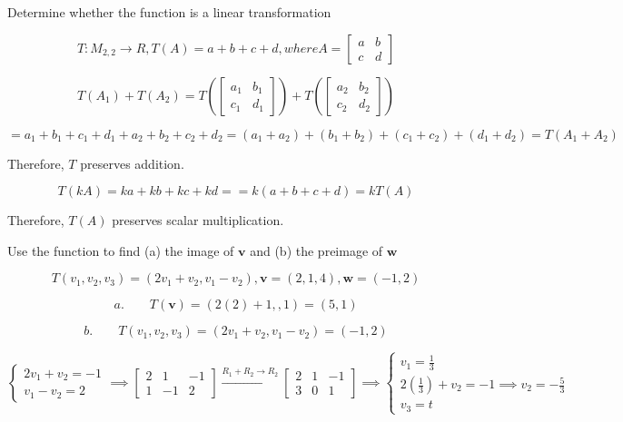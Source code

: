 \documentclass{report}
\begin{document}
\begin{tcolorbox}[colframe = lightred]
	Determine whether the function is a linear transformation
	
	$$
	T: M_{2,2} \to R, T(A) = a + b + c + d, where A = \begin{bmatrix} a & b \\ c & d \end{bmatrix}
	$$
\end{tcolorbox}

$$
T(A_1) + T(A_2) = T \left( \begin{bmatrix} a_1 & b_1 \\ c_1 & d_1 \end{bmatrix} \right) + T \left( \begin{bmatrix} a_2 & b_2 \\ c_2 & d_2 \end{bmatrix} \right)
$$

$$
= a_1 + b_1 + c_1 + d_1 + a_2 + b_2 + c_2 + d_2 = (a_1 + a_2) + (b_1 + b_2) + (c_1 + c_2) + (d_1 + d_2)  =T (A_1 + A_2)
$$

\noindent Therefore, $T$ preserves addition.

$$
T(kA) = ka + kb + kc + kd = = k (a+b+c+d) = kT(A)
$$

\noindent Therefore, $T(A)$ preserves scalar multiplication.

\begin{tcolorbox}[colframe = lightred]
	Use the function to find (a) the image of $\bm{v}$ and (b) the preimage of $\bm{w}$
	
	$$
	T(v_1, v_2, v_3) = (2v_1 + v_2, v_1  - v_2), \bm{v} = (2,1,4), \bm{w} =(-1,2)
	$$
\end{tcolorbox}

$$
a. \quad \quad T(\bm{v}) = (2(2)+1,, 1) = (5,1)
$$

$$
b. \quad \quad T(v_1, v_2, v_3) = (2v_1 + v_2, v_1 - v_2) = (-1,2)
$$

$$
\begin{cases}
	2v_1 + v_2 = -1 \\
	v_1 - v_2 = 2 
\end{cases}
\implies
\begin{bmatrix} 2 & 1 & -1 \\ 1 & -1 & 2 \end{bmatrix} \xrightarrow{R_1 + R_2 \to R_2}
\begin{bmatrix} 2 & 1 & -1 \\ 3 & 0 & 1 \end{bmatrix} \implies 
\begin{cases}
	v_1 = \frac{1}{3}\\
	2\left(\frac{1}{3}\right) + v_2 = -1 \implies v_2 = -\frac{5}{3} \\
	v_3 = t
\end{cases}
$$
\end{document}

